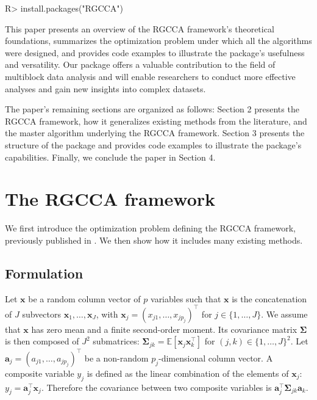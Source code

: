 \documentclass[
]{jss}
\begin{document}
\footnotesize

\begin{CodeChunk}
\begin{CodeInput}
R> install.packages("RGCCA")
\end{CodeInput}
\end{CodeChunk}

\normalsize

This paper presents an overview of the RGCCA framework's theoretical
foundations, summarizes the optimization problem under which all the
algorithms were designed, and provides code examples to illustrate the
package's usefulness and versatility. Our package offers a valuable
contribution to the field of multiblock data analysis and will enable
researchers to conduct more effective analyses and gain new insights
into complex datasets.

The paper's remaining sections are organized as follows: Section 2
presents the RGCCA framework, how it generalizes existing methods from
the literature, and the master algorithm underlying the RGCCA framework.
Section 3 presents the structure of the package and provides code
examples to illustrate the package's capabilities. Finally, we conclude
the paper in Section 4.

\section{The RGCCA framework}\label{the-rgcca-framework}

We first introduce the optimization problem defining the RGCCA
framework, previously published in
\cite{Tenenhaus2011, Tenenhaus2014, Tenenhaus2015, Tenenhaus2017}. We
then show how it includes many existing methods.

\subsection{Formulation}\label{formulation}

Let \(\boldsymbol x\) be a random column vector of \(p\) variables such
that \(\boldsymbol x\) is the concatenation of \(J\) subvectors
\(\boldsymbol x_1, \dots, \boldsymbol x_J\), with
\(\boldsymbol x_j = (x_{j1}, \ldots, x_{jp_j})^\top\) for
\(j \in \{1, \dots, J\}\). We assume that \(\boldsymbol x\) has zero
mean and a finite second-order moment. Its covariance matrix
\(\mathbf \Sigma\) is then composed of \(J^2\) submatrices:
\(\mathbf \Sigma_{jk} = \mathbb{E}\left[\boldsymbol x_j \boldsymbol x_k^\top\right]\)
for \((j, k) \in \{1, \dots, J\}^2\). Let
\(\mathbf a_j = (a_{j1}, \ldots, a_{jp_j})^\top\) be a non-random
\(p_j\)-dimensional column vector. A composite variable \(y_j\) is
defined as the linear combination of the elements of
\(\boldsymbol x_j\): \(y_j =  \mathbf a_j^\top \boldsymbol x_j\).
Therefore the covariance between two composite variables is
\(\mathbf{a}_j^\top \mathbf \Sigma_{jk} \mathbf{a}_k\).
\end{document}
